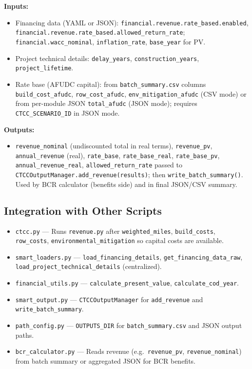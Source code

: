 \documentclass[ctcc_full_documentation.tex]{subfiles}
\begin{document}
\textbf{Inputs:}
\begin{itemize}
    \item Financing data (YAML or JSON): \texttt{financial.revenue.rate\_based.enabled}, \texttt{financial.revenue.rate\_based.allowed\_return\_rate}; \texttt{financial.wacc\_nominal}, \texttt{inflation\_rate}, \texttt{base\_year} for PV.
    \item Project technical details: \texttt{delay\_years}, \texttt{construction\_years}, \texttt{project\_lifetime}.
    \item Rate base (AFUDC capital): from \texttt{batch\_summary.csv} columns \texttt{build\_cost\_afudc}, \texttt{row\_cost\_afudc}, \texttt{env\_mitigation\_afudc} (CSV mode) or from per-module JSON \texttt{total\_afudc} (JSON mode); requires \texttt{CTCC\_SCENARIO\_ID} in JSON mode.
\end{itemize}

\textbf{Outputs:}
\begin{itemize}
    \item \texttt{revenue\_nominal} (undiscounted total in real terms), \texttt{revenue\_pv}, \texttt{annual\_revenue} (real), \texttt{rate\_base}, \texttt{rate\_base\_real}, \texttt{rate\_base\_pv}, \texttt{annual\_revenue\_real}, \texttt{allowed\_return\_rate} passed to \texttt{CTCCOutputManager.add\_revenue(results)}; then \texttt{write\_batch\_summary()}. Used by BCR calculator (benefits side) and in final JSON/CSV summary.
\end{itemize}

\subsection{Integration with Other Scripts}

\begin{itemize}
    \item \texttt{ctcc.py} --- Runs \texttt{revenue.py} after \texttt{weighted\_miles}, \texttt{build\_costs}, \texttt{row\_costs}, \texttt{environmental\_mitigation} so capital costs are available.
    \item \texttt{smart\_loaders.py} --- \texttt{load\_financing\_details}, \texttt{get\_financing\_data\_raw}, \texttt{load\_project\_technical\_details} (centralized).
    \item \texttt{financial\_utils.py} --- \texttt{calculate\_present\_value}, \texttt{calculate\_cod\_year}.
    \item \texttt{smart\_output.py} --- \texttt{CTCCOutputManager} for \texttt{add\_revenue} and \texttt{write\_batch\_summary}.
    \item \texttt{path\_config.py} --- \texttt{OUTPUTS\_DIR} for \texttt{batch\_summary.csv} and JSON output paths.
    \item \texttt{bcr\_calculator.py} --- Reads revenue (e.g.\ \texttt{revenue\_pv}, \texttt{revenue\_nominal}) from batch summary or aggregated JSON for BCR benefits.
\end{itemize}
\end{document}
